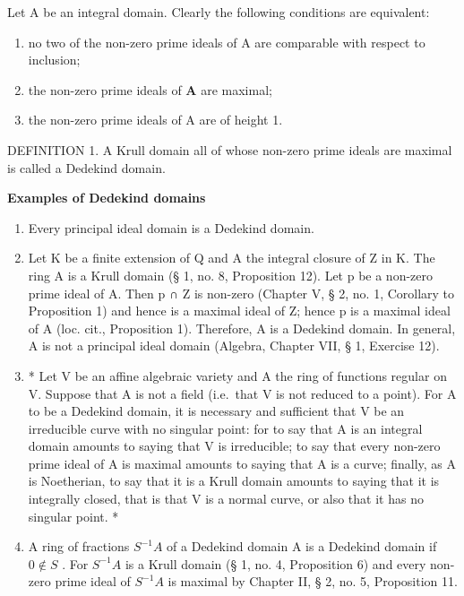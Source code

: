 Let A be an integral domain. Clearly the following conditions are equivalent:

\begin{enumerate}
\def\labelenumi{(\alph{enumi})}
\item
  no two of the non-zero prime ideals of A are comparable with respect to inclusion;
\item
  the non-zero prime ideals of \(\mathbf{A}\) are maximal;
\item
  the non-zero prime ideals of A are of height 1.
\end{enumerate}

DEFINITION 1. A Krull domain all of whose non-zero prime ideals are maximal is called a Dedekind domain.

\textbf{Examples of Dedekind domains}\par

\begin{enumerate}
\def\labelenumi{(\arabic{enumi})}
\item
  Every principal ideal domain is a Dedekind domain.
\item
  Let K be a finite extension of Q and A the integral closure of Z in K. The ring A is a Krull domain (§ 1, no. 8, Proposition 12). Let p be a non-zero prime ideal of A. Then p ∩ Z is non-zero (Chapter V, § 2, no. 1, Corollary to Proposition 1) and hence is a maximal ideal of Z; hence p is a maximal ideal of A (loc. cit., Proposition 1). Therefore, A is a Dedekind domain. In general, A is not a principal ideal domain (Algebra, Chapter VII, § 1, Exercise 12).
\item
  * Let V be an affine algebraic variety and A the ring of functions regular on V. Suppose that A is not a field (i.e.~that V is not reduced to a point). For A to be a Dedekind domain, it is necessary and sufficient that V be an irreducible curve with no singular point: for to say that A is an integral domain amounts to saying that V is irreducible; to say that every non-zero prime ideal of A is maximal amounts to saying that A is a curve; finally, as A is Noetherian, to say that it is a Krull domain amounts to saying that it is integrally closed, that is that V is a normal curve, or also that it has no singular point. *
\item
  A ring of fractions \(S^{-1}A\) of a Dedekind domain A is a Dedekind domain if \(0 \notin S\) . For \(S^{-1}A\) is a Krull domain (§ 1, no. 4, Proposition 6) and every non-zero prime ideal of \(S^{-1}A\) is maximal by Chapter II, § 2, no. 5, Proposition 11.
\end{enumerate}

